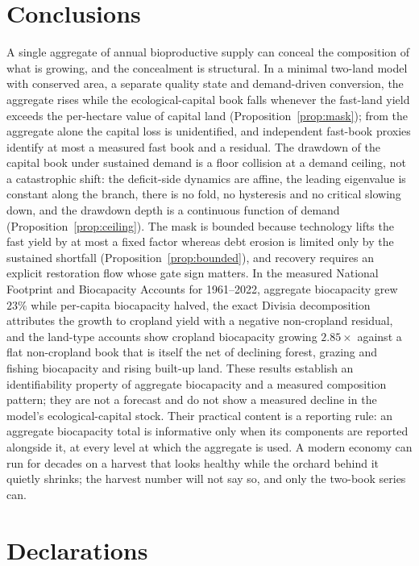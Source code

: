 \section{Conclusions}\label{sec:conclusions}

A single aggregate of annual bioproductive supply can conceal the composition of what is growing, and the concealment is structural. In a minimal two-land model with conserved area, a separate quality state and demand-driven conversion, the aggregate rises while the ecological-capital book falls whenever the fast-land yield exceeds the per-hectare value of capital land (Proposition~\ref{prop:mask}); from the aggregate alone the capital loss is unidentified, and independent fast-book proxies identify at most a measured fast book and a residual. The drawdown of the capital book under sustained demand is a floor collision at a demand ceiling, not a catastrophic shift: the deficit-side dynamics are affine, the leading eigenvalue is constant along the branch, there is no fold, no hysteresis and no critical slowing down, and the drawdown depth is a continuous function of demand (Proposition~\ref{prop:ceiling}). The mask is bounded because technology lifts the fast yield by at most a fixed factor whereas debt erosion is limited only by the sustained shortfall (Proposition~\ref{prop:bounded}), and recovery requires an explicit restoration flow whose gate sign matters. In the measured National Footprint and Biocapacity Accounts for 1961--2022, aggregate biocapacity grew $23\%$ while per-capita biocapacity halved, the exact Divisia decomposition attributes the growth to cropland yield with a negative non-cropland residual, and the land-type accounts show cropland biocapacity growing $2.85\times$ against a flat non-cropland book that is itself the net of declining forest, grazing and fishing biocapacity and rising built-up land. These results establish an identifiability property of aggregate biocapacity and a measured composition pattern; they are not a forecast and do not show a measured decline in the model's ecological-capital stock. Their practical content is a reporting rule: an aggregate biocapacity total is informative only when its components are reported alongside it, at every level at which the aggregate is used. A modern economy can run for decades on a harvest that looks healthy while the orchard behind it quietly shrinks; the harvest number will not say so, and only the two-book series can.

\section*{Declarations}

